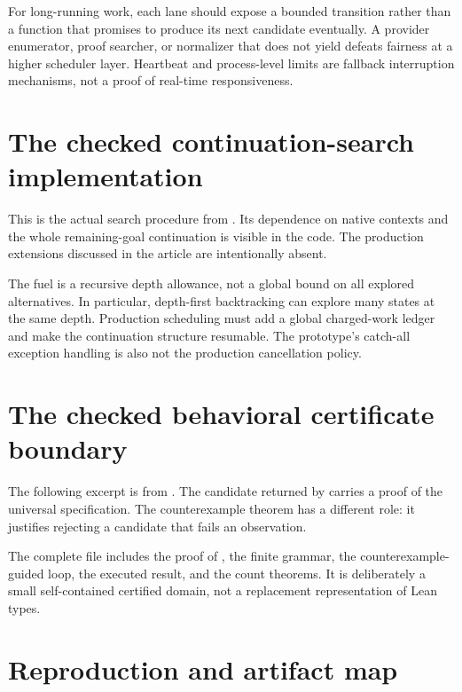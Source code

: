 For long-running work, each lane should expose a bounded transition rather than a function that promises to produce its next candidate eventually. A provider enumerator, proof searcher, or normalizer that does not yield defeats fairness at a higher scheduler layer. Heartbeat and process-level limits are fallback interruption mechanisms, not a proof of real-time responsiveness.

\section{The checked continuation-search implementation}
\label{app:core}

This is the actual search procedure from . Its dependence on native contexts and the whole remaining-goal continuation is visible in the code. The production extensions discussed in the article are intentionally absent.



The fuel is a recursive depth allowance, not a global bound on all explored alternatives. In particular, depth-first backtracking can explore many states at the same depth. Production scheduling must add a global charged-work ledger and make the continuation structure resumable. The prototype's catch-all exception handling is also not the production cancellation policy.

\section{The checked behavioral certificate boundary}
\label{app:behavior}

The following excerpt is from . The candidate returned by  carries a proof of the universal specification. The counterexample theorem has a different role: it justifies rejecting a candidate that fails an observation.



The complete file includes the proof of , the finite grammar, the counterexample-guided loop, the executed result, and the count theorems. It is deliberately a small self-contained certified domain, not a replacement representation of Lean types.

\section{Reproduction and artifact map}
\label{app:reproduce}

